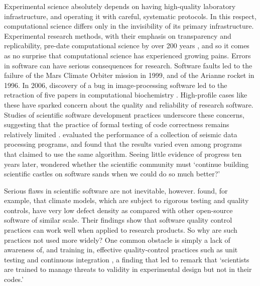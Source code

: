 \documentclass[12pt]{amsart}
\begin{document}
Experimental science absolutely depends on having high-quality laboratory infrastructure, and operating it with careful, systematic protocols. In this respect, computational science differs only in the invisibility of its primary infrastructure. Experimental research methods, with their emphasis on transparency and replicability, pre-date computational science by over 200 years \citep{wilson2006s,fomel2009reproducible}, and so it comes as no surprise that computational science has experienced growing pains. Errors in software can have serious consequences for research. Software faults led to the failure of the Mars Climate Orbiter mission in 1999, and of the Arianne rocket in 1996. In 2006, discovery of a bug in image-processing software led to the retraction of five papers in computational biochemistry \citep{miller2006scientist}. High-profile cases like these have sparked concern about the quality and reliability of research software. Studies of scientific software development practices underscore these concerns, suggesting that the practice of formal testing of code correctness remains relatively limited \citep{post2005computational,wilson2006s,hannay2009scientists,nguyen2010survey,clune2011software,howison2011scientific,prabhu2011survey,kanewala2014testing,heaton2015claims}. \citet{hatton1997t} evaluated the performance of a collection of seismic data processing programs, and found that the results varied even among programs that claimed to use the same algorithm. Seeing little evidence of progress ten years later, \citet{hatton2007chimera} wondered whether the scientific community must `continue building scientific castles on software sands when we could do so much better?'

Serious flaws in scientific software are not inevitable, however. \citet{pipitone2012assessing} found, for example, that climate models, which are subject to rigorous testing and quality controls, have very low defect density as compared with other open-source software of similar scale. Their findings show that software quality control practices can work well when applied to research products. So why are such practices not used more widely? One common obstacle is simply a lack of awareness of, and training in, effective quality-control practices such as unit testing and continuous integration \citep{wilson2006s,faulk2009scientific,hannay2009scientists,kanewala2014testing}, a finding that led \citet{faulk2009scientific} to remark that `scientists are trained to manage threats to validity in experimental design but not in their codes.'
\end{document}
